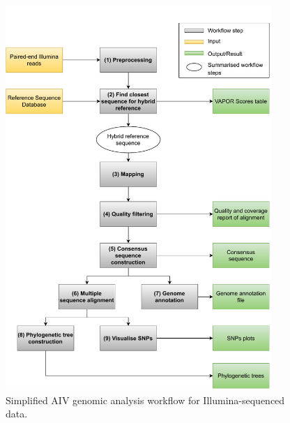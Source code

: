 \begin{figure}[ht!]
	\includegraphics[width=0.9\textwidth]{media/3-aiv.pdf}
	\caption{Simplified \ac{AIV} genomic analysis workflow for Illumina-sequenced data.}
	\label{fig:3-aiv-wf}
\end{figure}

